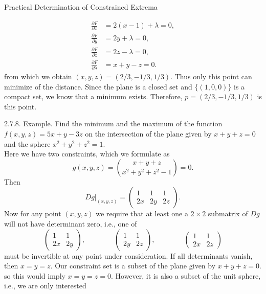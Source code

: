 \documentclass[smaller,hyperref={CJKbookmarks=true}]{beamer}
\begin{document}
\begin{frame}{Practical Determination of Constrained Extrema}
\begin{spacing}{1.1}
\begin{align*}
  \frac{\partial F}{\partial x} &=2(x-1)+\lambda=0, \\
  \frac{\partial F}{\partial y} &=2y+\lambda=0, \\
  \frac{\partial F}{\partial z} &=2z-\lambda=0, \\
  \frac{\partial F}{\partial\lambda} &=x+y-z=0.
\end{align*}
from which we obtain $(x,y,z)=(2/3,-1/3,1/3)$. Thus only this point
can minimize of the distance. Since the plane is a closed set and $\{(1,0,0)\}$ is a compact set, we know that a minimum exists. Therefore, $p=(2/3,-1/3,1/3)$ is this point.
\end{spacing}
\newpage
\begin{spacing}{0.9}
\alert{2.7.8. Example.} Find the minimum and the maximum of the function $f(x,y,z)=5x+y-3z$ on the intersection of the plane given by $x+y+z=0$ and the sphere $x^2+y^2+z^2=1$.\\[5pt]
Here we have two constraints, which we formulate as
\[g(x,y,z)=\binom{x+y+z}{x^2+y^2+z^2-1}=0.\]
Then
\begin{equation}\label{2.7.5}
  Dg|_{(x,y,z)}=\begin{pmatrix}
                  1 & 1 & 1 \\
                  2x & 2y & 2z
                \end{pmatrix}.
\end{equation}
Now for any point $(x,y,z)$ we require that at least one a $2\times 2$ submatrix of $Dg$ will not have determinant zero, i.e., one of
\[\begin{pmatrix}
    1 & 1 \\
    2x & 2y
  \end{pmatrix},\qquad\qquad\begin{pmatrix}
                              1 & 1 \\
                              2y & 2z
                            \end{pmatrix},\qquad\qquad\begin{pmatrix}
                                                        1 &1 \\
                                                        2x & 2z                                                      \end{pmatrix}\]
\vspace*{-6pt}
must be invertible at any point under consideration.
\newpage
If all determinants vanish, then $x=y=z$. Our constraint set is a subset of the plane given by $x+y+z=0$. so this would imply $x=y=z=0$. However, it is also a subset of the unit sphere, i.e., we are only interested

\end{spacing}
\end{frame}
\end{document}
